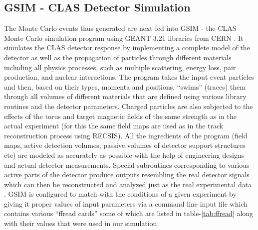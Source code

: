 \subsection{GSIM - CLAS Detector Simulation} 
\label{gsim}
The Monte Carlo events thus generated are next fed into GSIM - the CLAS Monte Carlo simulation program using GEANT 3.21 libraries from CERN \cite{gsimMH_wb}. It %
simulates the CLAS detector response by implementing a complete model of the detector as well as the propagation of particles through different materials including all physics processes, such as multiple scattering, energy loss, pair production, and nuclear interactions. The program takes the input event particles and then, based on their types, momenta and positions, %
``swims'' (traces) them through all %
volumes of different materials that are defined using various library routines and the detector parameters. Charged particles are also subjected to the effects of the torus and target magnetic fields of the same strength as in the actual experiment (for this the same field maps are used as in the track reconstruction process using RECSIS). All the ingredients of the program (field maps, active detection volumes, passive volumes of detector support structures etc) are modeled as accurately as possible with the help of engineering designs and actual detector measurements. Special subroutines corresponding to various active parts of the detector produce outputs resembling the real detector signals which can then be reconstructed and analyzed just as the real experimental data \cite{clasBrooks}%
\cite{bDey_th}. %
GSIM is configured to match with the conditions of a given experiment by giving it proper values of input parameters via a command line input file which contains various ``ffread cards'' some of which are listed in table-\ref{tab:ffread} along with their values that were used in our simulation.


